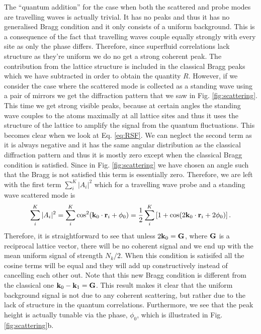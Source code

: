 The ``quantum addition'' for the case when both the scattered and
probe modes are travelling waves is actually trivial. It has no peaks
and thus it has no generalised Bragg condition and it only consists of
a uniform background. This is a consequence of the fact that
travelling waves couple equally strongly with every site as only the
phase differs. Therefore, since superfluid correlations lack structure
as they're uniform we do no get a strong coherent peak. The
contribution from the lattice structure is included in the classical
Bragg peaks which we have subtracted in order to obtain the quantity
$R$. However, if we consider the case where the scattered mode is
collected as a standing wave using a pair of mirrors we get the
diffraction pattern that we saw in Fig. \ref{fig:scattering}. This
time we get strong visible peaks, because at certain angles the
standing wave couples to the atoms maximally at all lattice sites and
thus it uses the structure of the lattice to amplify the signal from
the quantum fluctuations. This becomes clear when we look at
Eq. \eqref{eq:RSF}. We can neglect the second term as it is always
negative and it has the same angular distribution as the classical
diffraction pattern and thus it is mostly zero except when the
classical Bragg condition is satisfied. Since in
Fig. \ref{fig:scattering} we have chosen an angle such that the Bragg
is not satisfied this term is essentially zero. Therefore, we are left
with the first term $\sum_i^K |A_i|^2$ which for a travelling wave
probe and a standing wave scattered mode is
\begin{equation}
  \sum_i^K |A_i|^2 = \sum_i^K \cos^2(\mathbf{k}_0 \cdot \mathbf{r}_i + \phi_0) =
  \frac{1}{2} \sum_i^K \left[1 + \cos(2 \mathbf{k}_0 \cdot \mathbf{r}_i + 2
    \phi_0) \right].
\end{equation}
Therefore, it is straightforward to see that unless
$2 \mathbf{k}_0 = \mathbf{G}$, where $\mathbf{G}$ is a reciprocal lattice vector,
there will be no coherent signal and we end up with the mean uniform
signal of strength $N_k/2$. When this condition is satisifed all the
cosine terms will be equal and they will add up constructively instead
of cancelling each other out. Note that this new Bragg condition is
different from the classical one $\mathbf{k}_0 - \mathbf{k}_1 = \mathbf{G}$. This
result makes it clear that the uniform background signal is not due to
any coherent scattering, but rather due to the lack of structure in
the quantum correlations. Furthermore, we see that the peak height is
actually tunable via the phase, $\phi_0$, which is illustrated in
Fig. \ref{fig:scattering}b.


